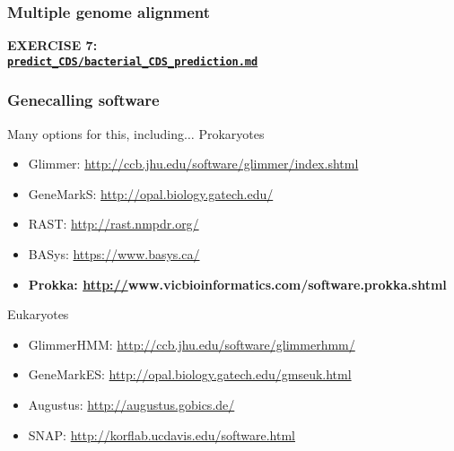 %
\begin{frame}
  \frametitle{Multiple genome alignment}
  \Large{
    \textcolor{hutton_blue}{
      \textbf{
      EXERCISE 7: \\
      {\small \href{https://github.com/widdowquinn/Teaching-2015-03-17-UoD_compgenvis/blob/master/exercises/predict_CDS/bacterial_CDS_prediction.md}{\texttt{predict\_CDS/bacterial\_CDS\_prediction.md}}}
      }
    }
  }
\end{frame}

%
\begin{frame}
  \frametitle{Genecalling software}
  \textcolor{hutton_green}{Many options for this, including$\ldots$}
  \textcolor{hutton_blue}{Prokaryotes}
  \begin{itemize}
    \item Glimmer: {\tiny\href{http://ccb.jhu.edu/software/glimmer/index.shtml}{http://ccb.jhu.edu/software/glimmer/index.shtml}}
    \item GeneMarkS: {\tiny\href{http://opal.biology.gatech.edu/}{http://opal.biology.gatech.edu/}}
    \item RAST: {\tiny\href{http://rast.nmpdr.org/}{http://rast.nmpdr.org/}}
    \item BASys: {\tiny\href{https://www.basys.ca/}{https://www.basys.ca/}}
    \item \textbf{Prokka: {\tiny\href{http://www.vicbioinformatics.com/software.prokka.shtml}{http://}www.vicbioinformatics.com/software.prokka.shtml}}
  \end{itemize}
  \textcolor{hutton_purple}{Eukaryotes}
  \begin{itemize}
    \item GlimmerHMM: {\tiny\href{http://ccb.jhu.edu/software/glimmerhmm/}{http://ccb.jhu.edu/software/glimmerhmm/}}
    \item GeneMarkES: {\tiny\href{http://opal.biology.gatech.edu/gmseuk.html}{http://opal.biology.gatech.edu/gmseuk.html}}
    \item Augustus: {\tiny\href{http://augustus.gobics.de/}{http://augustus.gobics.de/}}
    \item SNAP: {\tiny\href{http://korflab.ucdavis.edu/software.html}{http://korflab.ucdavis.edu/software.html}}
  \end{itemize}
\end{frame}

